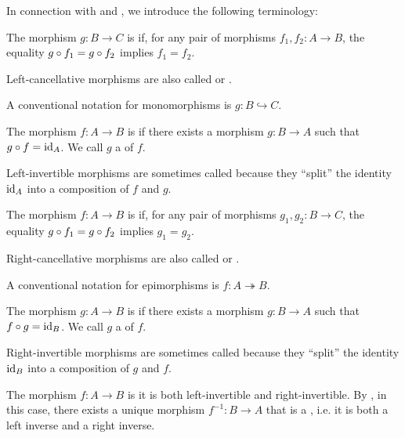 \begin{definition}\label{def:morphism_invertibility}
  In connection with  and , we introduce the following terminology:
  \begin{thmenum}
     The morphism \( g: B \to C \) is  if, for any pair of morphisms \( f_1, f_2: A \to B \), the equality \( g \mathbin \circ f_1 = g \mathbin \circ f_2 \) implies \( f_1 = f_2 \).

    Left-cancellative morphisms are also called  or .

    A conventional notation for monomorphisms is \( g: B \hookrightarrow C \).

     The morphism \( f: A \to B \) is  if there exists a morphism \( g: B \to A \) such that \( g \mathbin \circ f = \operatorname{id}_A \). We call \( g \) a  of \( f \).

    Left-invertible morphisms are sometimes called  because they \enquote{split} the identity \( \operatorname{id}_A \) into a composition of \( f \) and \( g \).

     The morphism \( f: A \to B \) is  if, for any pair of morphisms \( g_1, g_2: B \to C \), the equality \( g \mathbin \circ f_1 = g \mathbin \circ f_2 \) implies \( g_1 = g_2 \).

    Right-cancellative morphisms are also called  or .

    A conventional notation for epimorphisms is \( f: A \twoheadrightarrow B \).

     The morphism \( g: A \to B \) is  if there exists a morphism \( g: B \to A \) such that \( f \mathbin \circ g = \operatorname{id}_B \). We call \( g \) a  of \( f \).

    Right-invertible morphisms are sometimes called  because they \enquote{split} the identity \( \operatorname{id}_B \) into a composition of \( g \) and \( f \).

     The morphism \( f: A \to B \) is  it is both left-invertible and right-invertible. By , in this case, there exists a unique morphism \( f^{-1}: B \to A \) that is a , i.e. it is both a left inverse and a right inverse.


\end{thmenum}
\end{definition}

